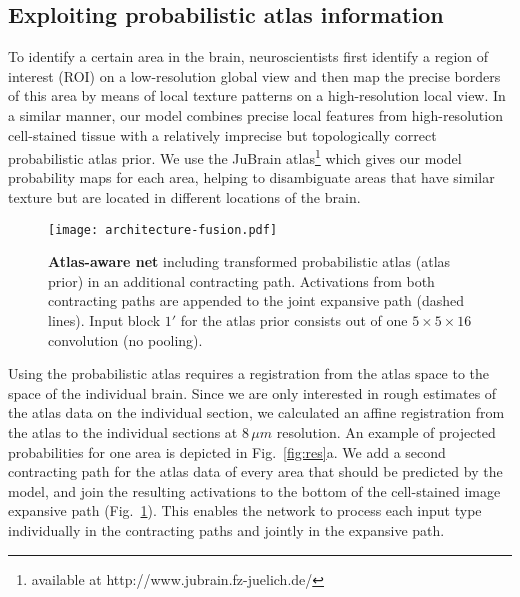 \documentclass{article}
\begin{document}
\vspace*{-.5\baselineskip}
\subsection{Exploiting probabilistic atlas information}
\label{sec:arch:prior}
\vspace*{-.5\baselineskip}


To identify a certain area in the brain, neuroscientists first identify a region of interest (ROI) on a low-resolution global view and then map the precise borders of this area by means of local texture patterns on a high-resolution local view.
In a similar manner, our model combines precise local features from high-resolution cell-stained tissue with a relatively imprecise but topologically correct probabilistic atlas prior.
We use the JuBrain atlas\footnote{available at http://www.jubrain.fz-juelich.de/} which gives our model probability maps for each area, helping to disambiguate areas that have similar texture but are located in different locations of the brain.

\begin{figure}
	\texttt{[image: architecture-fusion.pdf]}
	\caption{
		\textbf{Atlas-aware net} including transformed probabilistic atlas (atlas prior) in an additional contracting path.
		Activations from both contracting paths are appended to the joint expansive path (dashed lines).
		Input block $1'$ for the atlas prior consists out of one $5\times5\times16$ convolution (no pooling).
	}
	\label{fig:arch-fusion}
\end{figure}


Using the probabilistic atlas requires a registration from the atlas space to the space of the individual brain.
Since we are only interested in rough estimates of the atlas data on the individual section, we calculated an affine registration from the atlas to the individual sections at $8\,\mu m$ resolution.
An example of projected probabilities for one area is depicted in Fig.~\ref{fig:res}a.
We add a second contracting path for the atlas data of every area that should be predicted by the model, and join the resulting activations to the bottom of the cell-stained image expansive path (Fig.~\ref{fig:arch-fusion}).
This enables the network to process each input type individually in the contracting paths and jointly in the expansive path.
\end{document}
